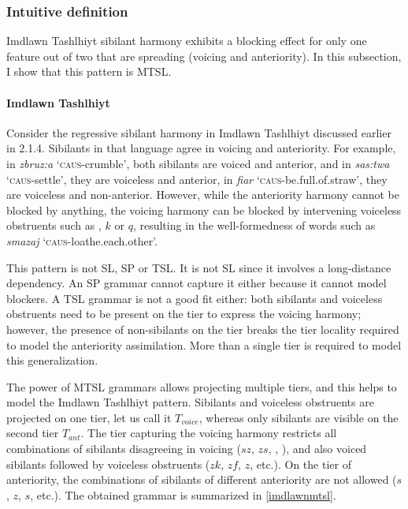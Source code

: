 \subsubsection{Intuitive definition}

Imdlawn Tashlhiyt sibilant harmony exhibits a blocking effect for only one feature out of two that are spreading (voicing and anteriority).
In this subsection, I show that this pattern is MTSL.

\paragraph{Imdlawn Tashlhiyt}
Consider the regressive sibilant harmony in Imdlawn Tashlhiyt discussed earlier in 2.1.4.
Sibilants in that language agree in voicing and anteriority.
For example, in \emph{zbruz:a} `\textsc{caus}-crumble', both sibilants are voiced and anterior, and in \emph{sas:twa} `\textsc{caus}-settle', they are voiceless and anterior, in \emph{\textesh fia\textesh r} `\textsc{caus}-be.full.of.straw', they are voiceless and non-anterior.
However, while the anteriority harmony cannot be blocked by anything, the voicing harmony can be blocked by intervening voiceless obstruents such as \textchi, $k$ or $q$, resulting in the well-formedness of words such as \emph{sm\textesh azaj} `\textsc{caus}-loathe.each.other'.

This pattern is not SL, SP or TSL.
It is not SL since it involves a long-distance dependency.
An SP grammar cannot capture it either because it cannot model blockers.
A TSL grammar is not a good fit either: both sibilants and voiceless obstruents need to be present on the tier to express the voicing harmony; however, the presence of non-sibilants on the tier breaks the tier locality required to model the anteriority assimilation.
More than a single tier is required to model this generalization.

The power of MTSL grammars allows projecting multiple tiers, and this helps to model the Imdlawn Tashlhiyt pattern.
Sibilants and voiceless obstruents are projected on one tier, let us call it $T_{voice}$, whereas only sibilants are visible on the second tier $T_{ant}$.
The tier capturing the voicing harmony restricts all combinations of sibilants disagreeing in voicing ($sz$, $zs$, \textesh\textyogh, \textyogh\textesh), and also voiced sibilants followed by voiceless obstruents ($zk$, $zf$, $z$\textchi, etc.).
On the tier of anteriority, the combinations of sibilants of different anteriority are not allowed ($s$\textesh, $z$\textesh, \textesh$s$, etc.).
The obtained grammar is summarized in \ref{imdlawnmtsl}.

